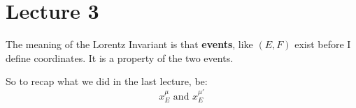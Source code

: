 \section{Lecture 3}

The meaning of the Lorentz Invariant is that \textbf{events}, like $\left( E,F \right)$ exist before I define coordinates. It is a property of the two events.

So to recap what we did in the last lecture, be:
\begin{equation}
x_{E}^{\mu } \text{ and } x_{E}^{\mu'}
\end{equation}
        
\bigskip
\begin{tikzpicture}[x=0.3pt,y=0.3pt,yscale=-1,xscale=1]


\end{tikzpicture}

